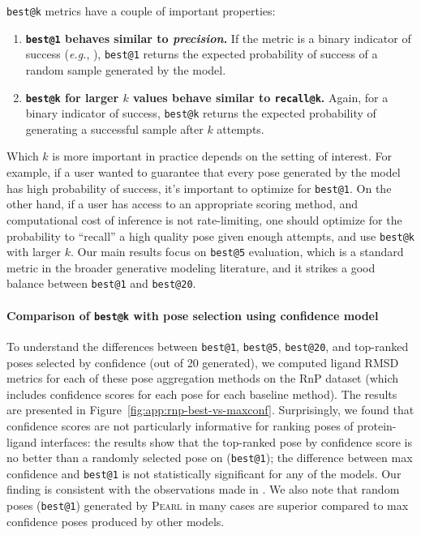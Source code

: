 \documentclass[11pt, letterpaper, onecolumn]{tau-class/tau}
\makeatletter
\newcommand{\pearl}{\textsc{Pearl}\xspace}
\newcommand{\best}[1]{\texttt{best@#1}\xspace}
\newcommand{\bestk}{\best{k}}
\newcommand{\rmsdtwoa}{\text{RMSD\,\raisebox{0.25ex}{\scriptsize <}\,2\,\AA}\xspace}
\newcommand{\rnp}{RnP\xspace}
\newcommand{\eg}{\textit{e.g.}\xspace}
\let\oldAA\AA
\renewcommand{\AA}{\oldAA\xspace}
\makeatother
\begin{document}
\bestk metrics have a couple of important properties:
\begin{enumerate}
    \item \textbf{\best1 behaves similar to \emph{precision}.}
    If the metric is a binary indicator of success (\eg, \rmsdtwoa), \best1 returns the expected probability of success of a random sample generated by the model.
    \item \textbf{\bestk for larger $k$ values behave similar to \texttt{recall@k}.}
    Again, for a binary indicator of success, \bestk returns the expected probability of generating a successful sample after $k$ attempts.
\end{enumerate}
Which $k$ is more important in practice depends on the setting of interest.
For example, if a user wanted to guarantee that every pose generated by the model has high probability of success, it's important to optimize for \texttt{best@1}.
On the other hand, if a user has access to an appropriate scoring method, and computational cost of inference is not rate-limiting, one should optimize for the probability to ``recall'' a high quality pose given enough attempts, and use \bestk with larger $k$.
Our main results focus on \best5 evaluation, which is a standard metric in the broader generative modeling literature, and it strikes a good balance between \best1 and \best{20}.

\paragraph{Comparison of \bestk with pose selection using confidence model}
To understand the differences between \best1, \best5, \best{20}, and top-ranked poses selected by confidence (out of 20 generated), we computed ligand RMSD metrics for each of these pose aggregation methods on the \rnp dataset (which includes confidence scores for each pose for each baseline method).
The results are presented in Figure~\ref{fig:app:rnp-best-vs-maxconf}.
Surprisingly, we found that confidence scores are not particularly informative for ranking poses of protein-ligand interfaces: the results show that the top-ranked pose by confidence score is no better than a randomly selected pose on (\best1); the difference between max confidence and \best1 is not statistically significant for any of the models.
Our finding is consistent with the observations made in \cite[][Section 2.5]{vskrinjar2025have}.
We also note that random poses (\best1) generated by \pearl in many cases are superior compared to max confidence poses produced by other models.
\end{document}
